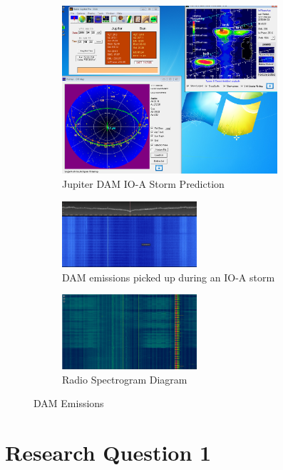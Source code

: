 \documentclass[runningheads,a4paper]{llncs}
\begin{document}
%
\begin{figure}	
	\centering
	\begin{subfigure}[t]{8cm}
		\centering
		\includegraphics[width=8cm]{images/52}
		\caption{Jupiter \gls{DAM} IO-A Storm Prediction}\label{fig:dam_emissions_io_a_april_23_prediction}		
	\end{subfigure}
	\quad
	\begin{subfigure}[t]{5cm}
		\centering
		\includegraphics[width=5cm]{images/54}
		\caption{\gls{DAM} emissions picked up during an IO-A storm}\label{fig:dam_emissions_io_a_april_23}
	\end{subfigure}
	\quad
	\begin{subfigure}[t]{5cm}
		\centering
		\includegraphics[width=5cm]{images/55}
		\caption{Radio Spectrogram Diagram \citep{superkuh-15}}\label{fig:wide_radio_spectrogram}
	\end{subfigure}
	\caption{DAM Emissions}\label{fig:jupiter_dam}
\end{figure}
%

%
%
\newpage
\chapter*{Research Question 1}
\end{document}
